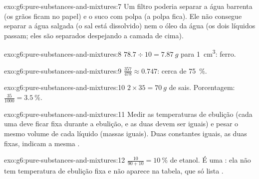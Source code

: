 \begin{solution}{exo:g6:pure-substances-and-mixtures:7}
Um filtro poderia separar a água barrenta (os grãos ficam no papel) e o
suco com polpa (a polpa fica). Ele não consegue separar a água salgada
(o sal está dissolvido) nem o óleo da água (os dois líquidos passam; eles
são separados despejando a camada de cima).
\end{solution}

\begin{solution}{exo:g6:pure-substances-and-mixtures:8}
$78.7 \div 10 = \qty{7.87}{g}$ para \qty{1}{cm^3}: ferro.
\end{solution}

\begin{solution}{exo:g6:pure-substances-and-mixtures:9}
$\frac{357}{478} \approx 0.747$: cerca de \qty{75}{\percent}.
\end{solution}

\begin{solution}{exo:g6:pure-substances-and-mixtures:10}
$2 \times 35 = \qty{70}{g}$ de sais. Porcentagem: $\frac{35}{1000} =
\qty{3.5}{\percent}$.
\end{solution}

\begin{solution}{exo:g6:pure-substances-and-mixtures:11}
Medir as temperaturas de ebulição (cada uma deve ficar fixa durante a
ebulição, e as duas devem ser iguais) e pesar o mesmo volume de cada
líquido (massas iguais). Duas constantes iguais, as duas fixas, indicam
a mesma .
\end{solution}

\begin{solution}{exo:g6:pure-substances-and-mixtures:12}
$\frac{10}{90 + 10} = \qty{10}{\percent}$ de etanol. É uma : ela
não tem temperatura de ebulição fixa e não aparece na tabela, que só
lista .
\end{solution}

